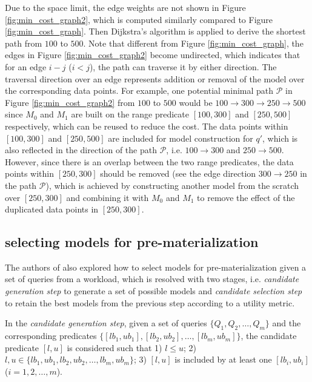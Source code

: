 Due to the space limit, the edge weights are not shown in Figure \ref{fig:min_cost_graph2}, which is computed similarly compared to Figure \ref{fig:min_cost_graph}. Then Dijkstra's algorithm is applied to derive the shortest path from $100$ to $500$. Note that different from Figure \ref{fig:min_cost_graph}, the edges in Figure \ref{fig:min_cost_graph2} become undirected, which indicates that for an edge $i-j$ ($i < j$), the path can traverse it by either direction. The traversal direction over an edge represents addition or removal of the model over the corresponding data points. For example, one potential minimal path $\mathcal{P}$ in Figure \ref{fig:min_cost_graph2} from $100$ to $500$ would be $100\rightarrow 300 \rightarrow 250 \rightarrow 500$ since $M_0$ and $M_1$ are built on the range predicate $[100, 300]$ and $[250, 500]$ respectively, which can be reused to reduce the cost. The data points within $[100, 300]$ and $[250, 500]$ are included for model construction for $q'$, which is also reflected in the direction of the path $\mathcal{P}$, i.e. $100 \rightarrow 300$ and $250 \rightarrow 500$. However, since there is an overlap between the two range predicates, the data points within $[250, 300]$ should be removed (see the edge direction $300\rightarrow250$ in the path $\mathcal{P}$), which is achieved by constructing another model from the scratch over $[250, 300]$ and combining it with $M_0$ and $M_1$ to remove the effect of the duplicated data points in $[250, 300]$.

\subsection{selecting models for pre-materialization}\label{sec: select_models}
The authors of \cite{hasani2018efficient} also explored how to select models for pre-materialization given a set of queries from a workload, which is resolved with two stages, i.e. {\em candidate generation step} to generate a set of possible models and {\em candidate selection step} to retain the best models from the previous step according to a utility metric.

In the {\em candidate generation step}, given a set of queries $\{Q_1, Q_2, \dots, Q_m\}$ and the corresponding predicates $\{[lb_1, ub_1], [lb_2, ub_2], \dots, [lb_m, ub_m]\}$, the candidate predicate $[l, u]$ is considered such that 1) $l \leq u$; 2) $l, u \in \{lb_1, ub_1, lb_2, ub_2, \dots, lb_m, ub_m\}$; 3) $[l, u]$ is included by at least one $[lb_i, ub_i]$ ($i=1,2,\dots, m$).

